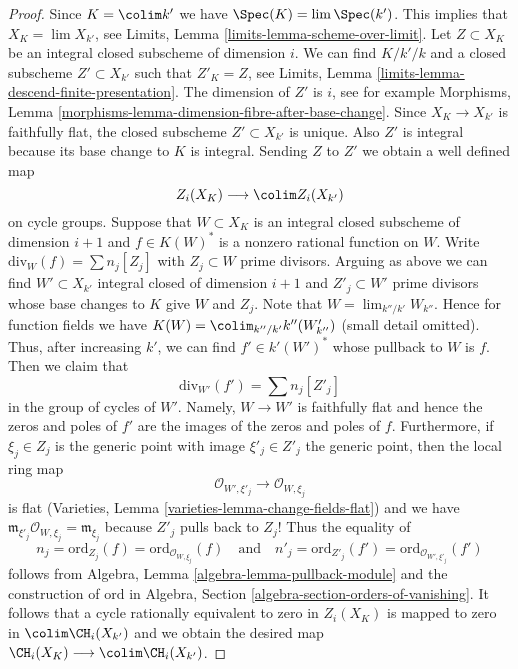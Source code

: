 \begin{proof}
\medskip\noindent
Since $K = \colim k'$ we have $\Spec(K) = \lim \Spec(k')$. This implies
that $X_K = \lim X_{k'}$, see
Limits, Lemma \ref{limits-lemma-scheme-over-limit}.
Let $Z \subset X_K$ be an integral closed subscheme of dimension $i$.
We can find $K/k'/k$ and a closed subscheme $Z' \subset X_{k'}$ such that
$Z'_K = Z$, see
Limits, Lemma \ref{limits-lemma-descend-finite-presentation}.
The dimension of $Z'$ is $i$, see for example
Morphisms, Lemma \ref{morphisms-lemma-dimension-fibre-after-base-change}.
Since $X_K \to X_{k'}$ is faithfully flat, the closed subscheme
$Z' \subset X_{k'}$ is unique.
Also $Z'$ is integral because its base change to $K$ is integral.
Sending $Z$ to $Z'$ we obtain a well defined map
$$
Z_i(X_K) \longrightarrow \colim Z_i(X_{k'})
$$
on cycle groups. Suppose that $W \subset X_K$ is an integral closed
subscheme of dimension $i + 1$ and $f \in K(W)^*$ is a nonzero rational
function on $W$. Write $\text{div}_W(f) = \sum n_j[Z_j]$ with $Z_j \subset W$
prime divisors. Arguing as above we can find $W' \subset X_{k'}$
integral closed of dimension $i + 1$ and $Z'_j \subset W'$ prime divisors
whose base changes to $K$ give $W$ and $Z_j$.
Note that $W = \lim_{k''/k'} W_{k''}$. Hence for function fields
we have $K(W) = \colim_{k''/k'} k''(W'_{k''})$ (small detail omitted).
Thus, after increasing $k'$, we can find $f' \in k'(W')^*$
whose pullback to $W$ is $f$. Then we claim that
$$
\text{div}_{W'}(f') = \sum n_j [Z'_j]
$$
in the group of cycles of $W'$. Namely, $W \to W'$ is faithfully flat
and hence the zeros and poles of $f'$ are the images of the zeros and
poles of $f$. Furthermore, if $\xi_j \in Z_j$ is the generic point with
image $\xi'_j \in Z'_j$ the generic point, then the local ring map
$$
\mathcal{O}_{W', \xi'_j}
\longrightarrow
\mathcal{O}_{W, \xi_j}
$$
is flat (Varieties, Lemma \ref{varieties-lemma-change-fields-flat})
and we have $\mathfrak m_{\xi'_j} \mathcal{O}_{W, \xi_j} = \mathfrak m_{\xi_j}$
because $Z'_j$ pulls back to $Z_j$! Thus the equality of
$$
n_j = \text{ord}_{Z_j}(f) =
\text{ord}_{\mathcal{O}_{W, \xi_j}}(f)
\quad\text{and}\quad
n'_j = \text{ord}_{Z'_j}(f') =
\text{ord}_{\mathcal{O}_{W', \xi'_j}}(f')
$$
follows from Algebra, Lemma \ref{algebra-lemma-pullback-module}
and the construction of $\text{ord}$ in
Algebra, Section \ref{algebra-section-orders-of-vanishing}.
It follows that a cycle rationally equivalent to zero in $Z_i(X_K)$
is mapped to zero in $\colim \CH_i(X_{k'})$
and we obtain the desired map
$\CH_i(X_K) \longrightarrow \colim \CH_i(X_{k'})$.


\end{proof}
